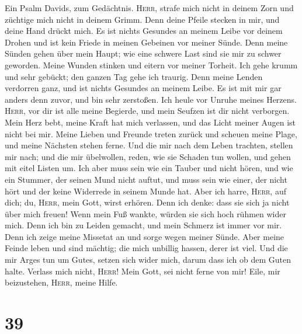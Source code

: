  Ein Psalm Davids, zum Gedächtnis. 
\textsc{Herr}, strafe mich nicht in deinem Zorn und züchtige mich nicht
in deinem Grimm.  Denn deine Pfeile stecken in mir, und
deine Hand drückt mich.  Es ist nichts Gesundes an meinem
Leibe vor deinem Drohen und ist kein Friede in meinen Gebeinen vor
meiner Sünde.  Denn meine Sünden gehen über mein Haupt;
wie eine schwere Last sind sie mir zu schwer geworden. 
Meine Wunden stinken und eitern vor meiner Torheit.  Ich
gehe krumm und sehr gebückt; den ganzen Tag gehe ich traurig.
 Denn meine Lenden verdorren ganz, und ist nichts Gesundes
an meinem Leibe.  Es ist mit mir gar anders denn zuvor,
und bin sehr zerstoßen. Ich heule vor Unruhe meines Herzens.
 \textsc{Herr}, vor dir ist alle meine Begierde, und mein
Seufzen ist dir nicht verborgen.  Mein Herz bebt, meine
Kraft hat mich verlassen, und das Licht meiner Augen ist nicht bei mir.
 Meine Lieben und Freunde treten zurück und scheuen meine
Plage, und meine Nächsten stehen ferne.  Und die mir nach
dem Leben trachten, stellen mir nach; und die mir übelwollen, reden, wie
sie Schaden tun wollen, und gehen mit eitel Listen um. 
Ich aber muss sein wie ein Tauber und nicht hören, und wie ein Stummer,
der seinen Mund nicht auftut,  und muss sein wie einer,
der nicht hört und der keine Widerrede in seinem Munde hat.
 Aber ich harre, \textsc{Herr}, auf dich; du,
\textsc{Herr}, mein Gott, wirst erhören.  Denn ich denke:
dass sie sich ja nicht über mich freuen! Wenn mein Fuß wankte, würden
sie sich hoch rühmen wider mich.  Denn ich bin zu Leiden
gemacht, und mein Schmerz ist immer vor mir.  Denn ich
zeige meine Missetat an und sorge wegen meiner Sünde. 
Aber meine Feinde leben und sind mächtig; die mich unbillig hassen,
derer ist viel.  Und die mir Arges tun um Gutes, setzen
sich wider mich, darum dass ich ob dem Guten halte. 
Verlass mich nicht, \textsc{Herr}! Mein Gott, sei nicht ferne von mir!
 Eile, mir beizustehen, \textsc{Herr}, meine Hilfe.

\hypertarget{section-38}{%
\section{39}\label{section-38}}


